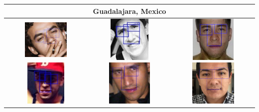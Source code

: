 \begin{table}[ht!]
\begin{center}
\begin{tabular}{c|c|c}
\midrule \multicolumn{3}{c}{Guadalajara, Mexico} \TBstrut \\ \midrule 
\includegraphics[height=2.2cm,width=2.2cm]{figures/results/detections/mexico/male/lq/f045e2cf-3131-4da5-8479-4ec6ce0d9232.jpeg}
\includegraphics[height=2.2cm,width=2.2cm]{figures/results/detections/mexico/male/lq/5de8479a-84a8-4dd0-8762-7726fdce6f37.jpeg}
&
\includegraphics[height=2.2cm,width=2.2cm]{figures/results/detections/mexico/male/mq/336c7aa9-b426-4cd9-88fe-7b7238190bda.jpeg}
\includegraphics[height=2.2cm,width=2.2cm]{figures/results/detections/mexico/male/mq/f1562834-ee8d-4012-8b28-94b2a4872207.jpeg}
&
\includegraphics[height=2.2cm,width=2.2cm]{figures/results/detections/mexico/male/hq/becf7959-ac84-4056-8c93-48e78ea54a56.jpeg}
\includegraphics[height=2.2cm,width=2.2cm]{figures/results/detections/mexico/male/hq/4e01b48f-0135-4b78-87fd-dbbed015be65.jpeg}
\TBstrut \\ 



\end{tabular}
\end{center}
\end{table}
